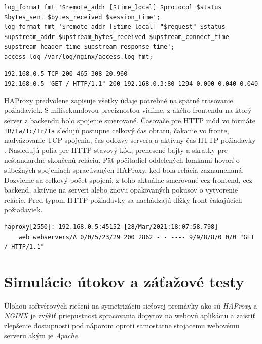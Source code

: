 \documentclass[12pt, a4paper]{article}
\begin{document}
\begin{lstlisting}[caption=NGINX: vlastná štruktúra TCP a HTTP Log, basicstyle=\ttfamily\scriptsize]
log_format fmt '$remote_addr [$time_local] $protocol $status $bytes_sent $bytes_received $session_time';
log_format fmt '$remote_addr [$time_local] "$request" $status $upstream_addr $upstream_bytes_received $upstream_connect_time $upstream_header_time $upstream_response_time';
access_log /var/log/nginx/access.log fmt;
\end{lstlisting}
\begin{lstlisting}[caption=NGINX záznamy z TCP a HTTP logov s vynechanou časovou pečiatkou]
192.168.0.5 TCP 200 465 308 20.960 
192.168.0.5 "GET / HTTP/1.1" 200 192.168.0.3:80 1294 0.000 0.040 0.040
\end{lstlisting}

HAProxy predvolene zapisuje všetky údaje potrebné na spätné trasovanie požiadaviek. S milisekundovou
precíznosťou vidíme, z akého frontendu na ktorý server z backendu bolo spojenie smerované. Časovače
pre HTTP mód vo formáte \verb|TR/Tw/Tc/Tr/Ta| sledujú postupne celkový čas obratu, čakanie vo fronte, 
nadväzovanie TCP spojenia, čas odozvy servera a aktívny čas HTTP požiadavky \cite{haproxy-logging}.
Nasledujú polia pre HTTP stavový kód, prenesené bajty a skratky pre neštandardne skončenú reláciu.
Päť počítadiel oddelených lomkami hovorí o súbežných spojeniach spracúvaných HAProxy, keď bola relácia
zaznamenaná. Dozvieme sa celkový počet spojení, z toho aktuálne smerované cez frontend, cez backend,
aktívne na serveri alebo znovu opakovaných pokusov o vytvorenie relácie. Pred typom HTTP požiadavky
sa nachádzajú dĺžky front čakajúcich požiadaviek.
\begin{lstlisting}[caption=HAProxy: predvolený formát záznamov v logoch, basicstyle=\ttfamily\scriptsize]
haproxy[2550]: 192.168.0.5:45152 [28/Mar/2021:18:07:58.798] 
    web webservers/A 0/0/5/23/29 200 2862 - - ---- 9/9/8/8/0 0/0 "GET / HTTP/1.1"
\end{lstlisting}

\section{Simulácie útokov a záťažové testy}
Úlohou softvérových riešení na symetrizáciu sieťovej premávky ako sú \emph{HAProxy} a \emph{NGINX}
je zvýšiť priepustnosť spracovania dopytov na webovú aplikáciu a zaistiť zlepšenie dostupnosti pod
náporom oproti samostatne stojacemu webovému serveru akým je \emph{Apache}. 
\end{document}
